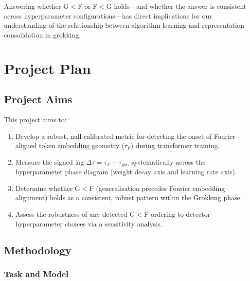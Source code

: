 \documentclass[12pt,openany,a4paper]{book}
\newcommand{\taug}{\tau_{\mathrm{gen}}}
\newcommand{\tauf}{\tau_{F}}
\newcommand{\Dtau}{\Delta\tau}
\begin{document}
Answering whether G$<$F or F$<$G holds---and whether the answer is
consistent across hyperparameter configurations---has direct implications
for our understanding of the relationship between algorithm learning
and representation consolidation in grokking.

\chapter{Project Plan}
\label{chap:plan}

\section{Project Aims}

This project aims to:
\begin{enumerate}
  \item Develop a robust, null-calibrated metric for detecting the
    onset of Fourier-aligned token embedding geometry ($\tauf$) during
    transformer training.
  \item Measure the signed lag $\Dtau = \tauf - \taug$ systematically
    across the hyperparameter phase diagram (weight decay axis and
    learning rate axis).
  \item Determine whether G$<$F (generalisation precedes Fourier
    embedding alignment) holds as a consistent, robust pattern within
    the Grokking phase.
  \item Assess the robustness of any detected G$<$F ordering to
    detector hyperparameter choices via a sensitivity analysis.
\end{enumerate}

\section{Methodology}

\subsection{Task and Model}
\end{document}
